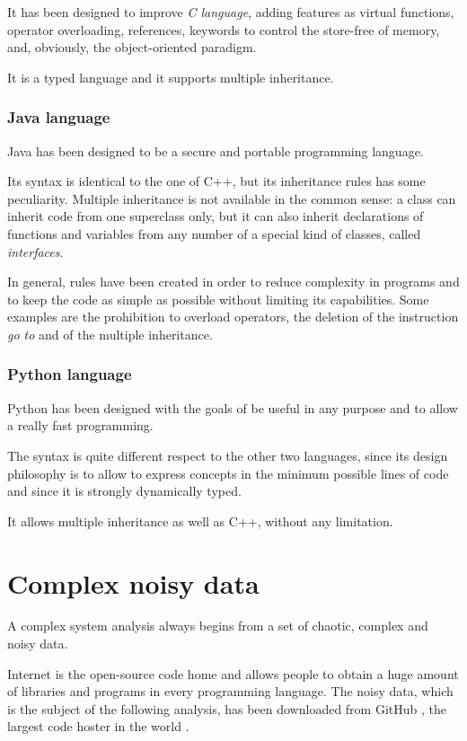 It has been designed to improve \textit{C language}, adding features as virtual functions, operator overloading, references, keywords to control the store-free of memory, and, obviously, the object-oriented paradigm.

It is a typed language and it supports multiple inheritance.

\subsubsection{Java language}
Java has been designed to be a secure and portable programming language.

Its syntax is identical to the one of C++, but its inheritance rules has some peculiarity. Multiple inheritance is not available in the common sense: a class can inherit code from one superclass only, but it can also inherit declarations of functions and variables from any number of a special kind of classes, called \textit{interfaces}.

In general, rules have been created in order to reduce complexity in programs and to keep the code as simple as possible without limiting its capabilities. Some examples are the prohibition to overload operators, the deletion of the instruction \textit{go to} and of the multiple inheritance.

\subsubsection{Python language}
Python has been designed with the goals of be useful in any purpose and to allow a really fast programming.

The syntax is quite different respect to the other two languages, since its design philosophy is to allow to express concepts in the minimum possible lines of code and since it is strongly dynamically typed.

It allows multiple inheritance as well as C++, without any limitation.

\section{Complex noisy data}
A complex system analysis always begins from a set of chaotic, complex and noisy data.

Internet is the open-source code home and allows people to obtain a huge amount of libraries and programs in every programming language. The noisy data, which is the subject of the following analysis, has been downloaded from GitHub \cite{gith}, the largest code hoster in the world \cite{gitworld}.

